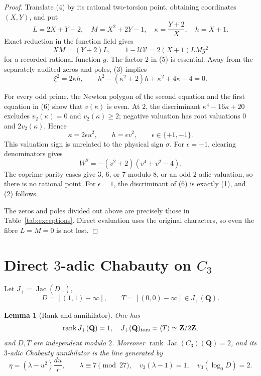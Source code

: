 \documentclass[11pt]{article}
\newtheorem{lemma}[theorem]{Lemma}
\newcommand{\Q}{\mathbf Q}
\begin{document}
\begin{proof}
Translate (4) by its rational two-torsion point, obtaining coordinates
$(X,Y)$, and put
\[
L=2X+Y-2,\quad M=X^2+2Y-1,\quad
\kappa=\frac{Y+2}{X},\quad h=X+1.
\]
Exact reduction in the function field gives
\[
 XM=(Y+2)L,\qquad
 1-\mathcal U\mathcal V
 =2(X+1)LMg^2                                      \tag{5}
\]
for a recorded rational function $g$.  The factor $2$ in (5) is essential.
Away from the separately audited zeros and poles, (3) implies
\[
 \xi^2=2\kappa h,\qquad
 h^2-(\kappa^2+2)h+\kappa^2+4\kappa-4=0.           \tag{6}
\]

For every odd prime, the Newton polygon of the second equation and the first
equation in (6) show that $v(\kappa)$ is even.  At $2$, the discriminant
$\kappa^4-16\kappa+20$ excludes $v_2(\kappa)=0$ and
$v_2(\kappa)\ge2$; negative valuation has root valuations $0$ and
$2v_2(\kappa)$.  Hence
\[
 \kappa=2\epsilon u^2,\qquad h=\epsilon v^2,\qquad
 \epsilon\in\{+1,-1\}.                               \tag{7}
\]
This valuation sign is unrelated to the physical sign $\sigma$.
For $\epsilon=-1$, clearing denominators gives
\[
 W^2=-(v^2+2)(v^4+v^2-4).
\]
The coprime parity cases give $3$, $6$, or $7$ modulo $8$, or an odd
$2$-adic valuation, so there is no rational point.  For $\epsilon=1$, the
discriminant of (6) is exactly (1), and (2) follows.

The zeros and poles divided out above are precisely those in
Table~\ref{tab:exceptions}.  Direct evaluation uses the original characters,
so even the fibre $L=M=0$ is not lost.
\end{proof}

\section{Direct $3$-adic Chabauty on $C_3$}

Let $J_+=\operatorname{Jac}(D_+)$,
\[
 D=[(1,1)-\infty],\qquad T=[(0,0)-\infty]\in J_+(\Q).
\]

\begin{lemma}[Rank and annihilator]\label{lem:rank}
One has
\[
 \operatorname{rank}J_+(\Q)=1,\quad
 J_+(\Q)_{\rm tors}=\langle T\rangle\simeq\mathbf Z/2\mathbf Z,
\]
and $D,T$ are independent modulo $2$.  Moreover
\(\operatorname{rank}\operatorname{Jac}(C_3)(\Q)=2\), and its
$3$-adic Chabauty annihilator is the line generated by
\[
 \eta=(\lambda-u^2)\frac{du}{r},\qquad
 \lambda\equiv7\pmod {27},\quad
 v_3(\lambda-1)=1,\quad v_3(\log_0D)=2.             \tag{8}
\]
\end{lemma}
\end{document}
